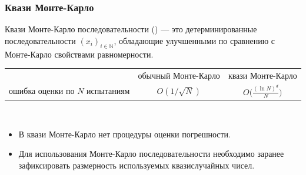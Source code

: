 \documentclass[unicode, notheorems]{beamer}
\begin{document}
\begin{frame}[t]\frametitle{Квази Монте-Карло}
    
Квази Монте-Карло последовательности (\cite{sobol}) --- это детерминированные последовательности $\left(x_i\right)_{i\in\mathbb N}$, обладающие улучшенными по сравнению с Монте-Карло свойствами равномерности. \\[10pt]

\begin{tabular}{rcc}
&обычный Монте-Карло&квази Монте-Карло\\
\parbox{3 cm}{ошибка оценки по $N$ испытаниям}&$\displaystyle{O(1 / \sqrt N)}$&$\displaystyle{O(\frac{\left(\ln N\right)^d}{N}})$
\end{tabular}\\[10pt]

\begin{itemize}
  \item В квази Монте-Карло нет процедуры оценки погрешности.
   \item Для использования Монте-Карло последовательности необходимо заранее зафиксировать размерность используемых квазислучайных чисел. 
 \end{itemize} 
\end{frame}
\end{document}
